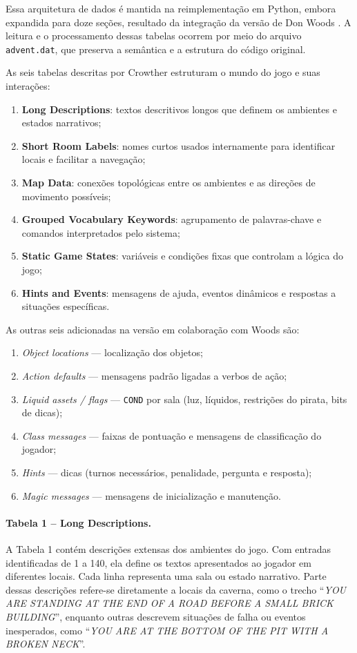\documentclass[12pt,a4paper]{article}
\begin{document}
Essa arquitetura de dados é mantida na reimplementação em Python, embora expandida para doze seções, resultado da integração da versão de Don Woods \textcite{rhodes_adventure_py}. A leitura e o processamento dessas tabelas ocorrem por meio do arquivo \texttt{advent.dat}, que preserva a semântica e a estrutura do código original. 

As seis tabelas descritas por Crowther estruturam o mundo do jogo e suas interações:
\begin{enumerate}
    \item \textbf{Long Descriptions}: textos descritivos longos que definem os ambientes e estados narrativos;
    \item \textbf{Short Room Labels}: nomes curtos usados internamente para identificar locais e facilitar a navegação;
    \item \textbf{Map Data}: conexões topológicas entre os ambientes e as direções de movimento possíveis;
    \item \textbf{Grouped Vocabulary Keywords}: agrupamento de palavras-chave e comandos interpretados pelo sistema;
    \item \textbf{Static Game States}: variáveis e condições fixas que controlam a lógica do jogo;
    \item \textbf{Hints and Events}: mensagens de ajuda, eventos dinâmicos e respostas a situações específicas.
\end{enumerate}

As outras seis adicionadas na versão em colaboração com Woods são:

\begin{enumerate}
  \item \emph{Object locations} — localização dos objetos;
  \item \emph{Action defaults} — mensagens padrão ligadas a verbos de ação;
  \item \emph{Liquid assets / flags} — \texttt{COND} por sala (luz, líquidos, restrições do pirata, bits de dicas);
  \item \emph{Class messages} — faixas de pontuação e mensagens de classificação do jogador;
  \item \emph{Hints} — dicas (turnos necessários, penalidade, pergunta e resposta);
  \item \emph{Magic messages} — mensagens de inicialização e manutenção.
\end{enumerate}

\paragraph{Tabela 1 – Long Descriptions.}  
A Tabela 1 contém descrições extensas dos ambientes do jogo. Com entradas identificadas de 1 a 140, ela define os textos apresentados ao jogador em diferentes locais. Cada linha representa uma sala ou estado narrativo. Parte dessas descrições refere-se diretamente a locais da caverna, como o trecho “\textit{YOU ARE STANDING AT THE END OF A ROAD BEFORE A SMALL BRICK BUILDING}”, enquanto outras descrevem situações de falha ou eventos inesperados, como “\textit{YOU ARE AT THE BOTTOM OF THE PIT WITH A BROKEN NECK}”.  
\end{document}
